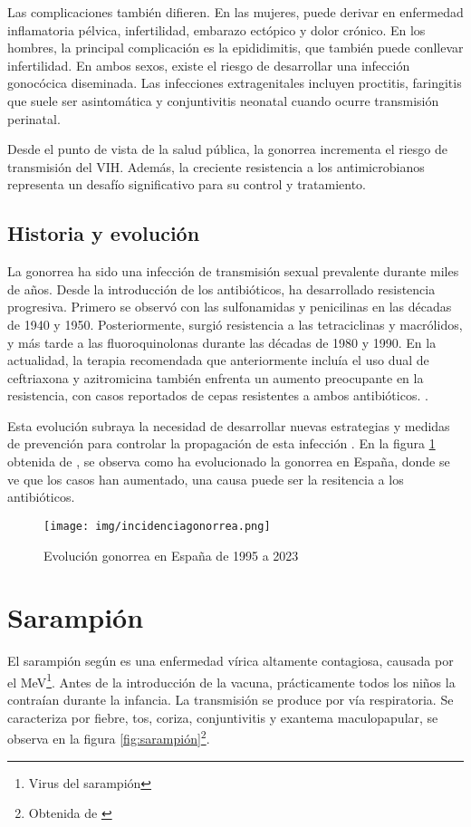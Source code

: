 \begin{enumerate}
Las complicaciones también difieren. En las mujeres, puede derivar en enfermedad inflamatoria pélvica, infertilidad, embarazo ectópico y dolor crónico. En los hombres, la principal complicación es la epididimitis, que también puede conllevar infertilidad. En ambos sexos, existe el riesgo de desarrollar una infección gonocócica diseminada. Las infecciones extragenitales incluyen proctitis, faringitis que suele ser asintomática y conjuntivitis neonatal cuando ocurre transmisión perinatal.

Desde el punto de vista de la salud pública, la gonorrea incrementa el riesgo de transmisión del VIH. Además, la creciente resistencia a los antimicrobianos representa un desafío significativo para su control y tratamiento.

\subsection{Historia y evolución}
La gonorrea ha sido una infección de transmisión sexual prevalente durante miles de años. Desde la introducción de los antibióticos, ha desarrollado resistencia progresiva. Primero se observó con las sulfonamidas y penicilinas en las décadas de 1940 y 1950. Posteriormente, surgió resistencia a las tetraciclinas y macrólidos, y más tarde a las fluoroquinolonas durante las décadas de 1980 y 1990. En la actualidad, la terapia recomendada que anteriormente incluía el uso dual de ceftriaxona y azitromicina también enfrenta un aumento preocupante en la resistencia, con casos reportados de cepas resistentes a ambos antibióticos. \cite{golparian2020genomic}.

Esta evolución subraya la necesidad de desarrollar nuevas estrategias y medidas de prevención para controlar la propagación de esta infección \cite{lin2021epidemiology}.
En la figura \ref{fig:evolución gonorrea} obtenida de \cite{isanidad2023}, se observa como ha evolucionado la gonorrea en España, donde se ve que los casos han aumentado, una causa puede ser la resitencia a los antibióticos.

\begin{figure}[H]
    \centering
    \texttt{[image: img/incidenciagonorrea.png]}
    \caption{Evolución gonorrea en España de 1995 a 2023}
    \label{fig:evolución gonorrea}
    \vspace{0.5cm} %
\end{figure}


\section{Sarampión}
El sarampión según \cite{workowski2021sexually}es una enfermedad vírica altamente contagiosa, causada por el MeV\footnote{Virus del sarampión}. Antes de la introducción de la vacuna, prácticamente todos los niños la contraían durante la infancia. La transmisión se produce por vía respiratoria. Se caracteriza por fiebre, tos, coriza, conjuntivitis y exantema maculopapular, se observa en la figura \ref{fig:sarampión}\footnote{Obtenida de \cite{tododiagnostico2020sarampion}}.


\end{enumerate}
